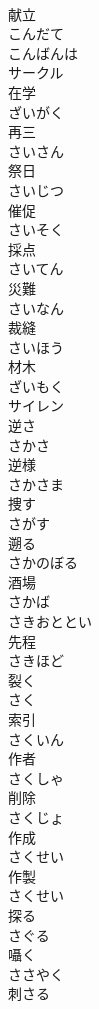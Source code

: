 \documentclass[8pt]{extreport}
\begin{document}
\begin{CJK}{UTF8}{min}
\\	献立 
\\	こんだて	
\\	こんばんは	
\\	サークル	
\\	在学 
\\	ざいがく	
\\	再三 
\\	さいさん	
\\	祭日 
\\	さいじつ	
\\	催促 
\\	さいそく	
\\	採点 
\\	さいてん	
\\	災難 
\\	さいなん	
\\	裁縫 
\\	さいほう	
\\	材木 
\\	ざいもく	
\\	サイレン	
\\	逆さ 
\\	さかさ	
\\	逆様 
\\	さかさま	
\\	捜す 
\\	さがす	
\\	遡る 
\\	さかのぼる	
\\	酒場 
\\	さかば	
\\	さきおととい	
\\	先程 
\\	さきほど	
\\	裂く 
\\	さく	
\\	索引 
\\	さくいん	
\\	作者 
\\	さくしゃ	
\\	削除 
\\	さくじょ	
\\	作成 
\\	さくせい	
\\	作製 
\\	さくせい	
\\	探る 
\\	さぐる	
\\	囁く 
\\	ささやく	
\\	刺さる 

\end{CJK}
\end{document}
